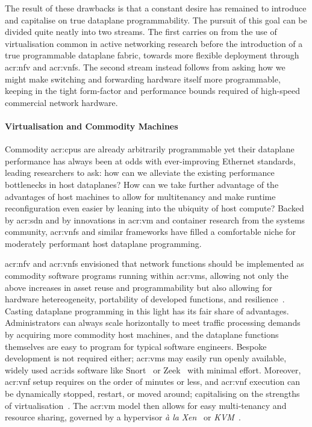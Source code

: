 The result of these drawbacks is that a constant desire has remained to introduce and capitalise on true dataplane programmability.
The pursuit of this goal can be divided quite neatly into two streams.
The first carries on from the use of virtualisation common in active networking research before the introduction of a true programmable dataplane fabric, towards more flexible deployment through \gls{acr:nfv} and \glspl{acr:vnf}.
The second stream instead follows from asking how we might make switching and forwarding hardware itself more programmable, keeping in the tight form-factor and performance bounds required of high-speed commercial network hardware.

\paragraph{Virtualisation and Commodity Machines}
Commodity \glspl{acr:cpu} are already arbitrarily programmable yet their dataplane performance has always been at odds with ever-improving Ethernet standards, leading researchers to ask: how can we alleviate the existing performance bottlenecks in host dataplanes?
How can we take further advantage of the advantages of host machines to allow for multitenancy and make runtime reconfiguration even easier by leaning into the ubiquity of host compute?
Backed by \gls{acr:sdn} and by innovations in \gls{acr:vm} and container research from the systems community, \glspl{acr:vnf} and similar frameworks have filled a comfortable niche for moderately performant host dataplane programming.

\gls{acr:nfv} and \glspl{acr:vnf} envisioned that network functions should be implemented as commodity software programs running within \glspl{acr:vm}, allowing not only the above increases in asset reuse and programmability but also allowing for hardware hetereogeneity, portability of developed functions, and resilience~\parencite{etsi-nfv}.
Casting dataplane programming in this light has its fair share of advantages.
Administrators can always scale horizontally to meet traffic processing demands by acquiring more commodity host machines, and the dataplane functions themselves are easy to program for typical software engineers.
Bespoke development is not required either; \glspl{acr:vm} may easily run openly available, widely used \gls{acr:ids} software like Snort~\parencite{DBLP:conf/lisa/Roesch99,SnortManual} or Zeek~\parencite{zeek,DBLP:conf/uss/Paxson98} with minimal effort.
Moreover, \gls{acr:vnf} setup requires on the order of minutes or less, and \gls{acr:vnf} execution can be dynamically stopped, restart, or moved around; capitalising on the strengths of virtualisation~\parencite{DBLP:conf/nsdi/MartinsAROHBH14,DBLP:conf/iscc/CzivaJWP15}.
The \gls{acr:vm} model then allows for easy multi-tenancy and resource sharing, governed by a hypervisor \emph{\`{a} la} \emph{Xen}~\parencite{DBLP:conf/sosp/BarhamDFHHHN03} or \emph{KVM}~\parencite{kvm}.

